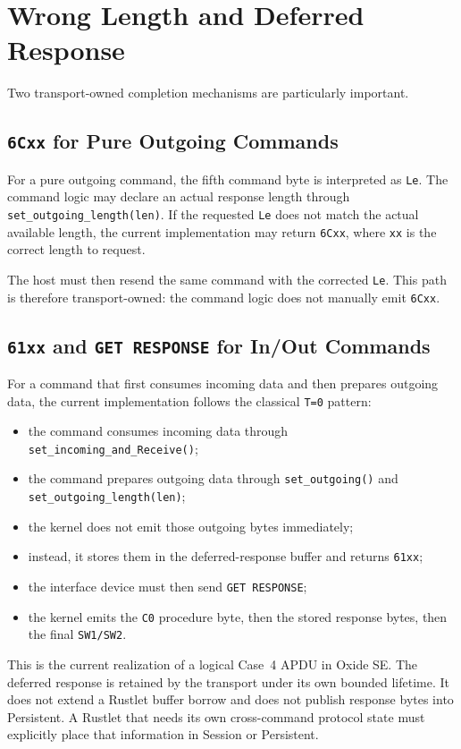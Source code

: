 \section{Wrong Length and Deferred Response}

Two transport-owned completion mechanisms are particularly important.

\subsection{\texttt{6Cxx} for Pure Outgoing Commands}

For a pure outgoing command, the fifth command byte is interpreted as
\texttt{Le}. The command logic may declare an actual response length
through \texttt{set\_outgoing\_length(len)}. If the requested
\texttt{Le} does not match the actual available length, the current
implementation may return \texttt{6Cxx}, where \texttt{xx} is the
correct length to request.

The host must then resend the same command with the corrected
\texttt{Le}. This path is therefore transport-owned: the command logic
does not manually emit \texttt{6Cxx}.

\subsection{\texttt{61xx} and \texttt{GET RESPONSE} for In/Out Commands}

For a command that first consumes incoming data and then prepares
outgoing data, the current implementation follows the classical
\texttt{T=0} pattern:
\begin{itemize}
\item the command consumes incoming data through
  \texttt{set\_incoming\_and\_Receive()};
\item the command prepares outgoing data through
  \texttt{set\_outgoing()} and \texttt{set\_outgoing\_length(len)};
\item the kernel does not emit those outgoing bytes immediately;
\item instead, it stores them in the deferred-response buffer and
  returns \texttt{61xx};
\item the interface device must then send \texttt{GET RESPONSE};
\item the kernel emits the \texttt{C0} procedure byte, then the stored
  response bytes, then the final \texttt{SW1/SW2}.
\end{itemize}

This is the current realization of a logical Case~4 APDU in Oxide SE.
The deferred response is retained by the transport under its own bounded
lifetime. It does not extend a Rustlet buffer borrow and does not publish
response bytes into Persistent. A Rustlet that needs its own cross-command
protocol state must explicitly place that information in Session or
Persistent.

